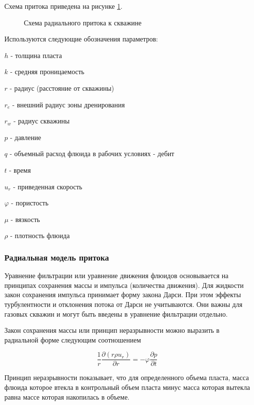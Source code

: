 Схема притока приведена на рисунке \ref{ris:radial_inflow_scheme}.

\begin{figure}[h!]
	\begin{center}
		
		\caption{Схема радиального притока к скважине}
		\label{ris:radial_inflow_scheme}
	\end{center}
\end{figure}

Используются следующие обозначения параметров:

\(h\) - толщина пласта

\(k\) - средняя проницаемость

\(r\) - радиус (расстояние от скважины)

\(r_e\) -  внешний радиус зоны дренирования

\(r_w\) - радиус скважины

\(p\) - давление

\(q\) - объемный расход флюида в рабочих условиях - дебит

\(t\) - время

\(u_r\) - приведенная скорость

\(\varphi\) -  пористость

\(\mu\) - вязкость

\(\rho\) - плотность флюида

\subsubsection{Радиальная модель притока}
Уравнение фильтрации или уравнение движения флюидов основывается на принципах сохранения массы и импульса (количества движения). Для жидкости закон сохранения импульса принимает форму закона Дарси. При этом эффекты турбулентности и отклонения потока от Дарси не учитываются. Они важны для газовых скважин и могут быть введены в уравнение фильтрации отдельно. 

Закон сохранения массы или принцип неразрывности можно выразить в радиальной форме следующим соотношением

\begin{equation} \label{eq:mass_balance_2}
\frac{1}{r}\frac{\partial\left(r\rho u_r\right)}{\partial r}=-\varphi\frac{\partial p}{\partial t}
\end{equation}

Принцип неразрывности показывает, что для определенного объема пласта, масса флюида которое втекла в контрольный объем пласта минус масса которая вытекла равна массе которая накопилась в объеме. 

